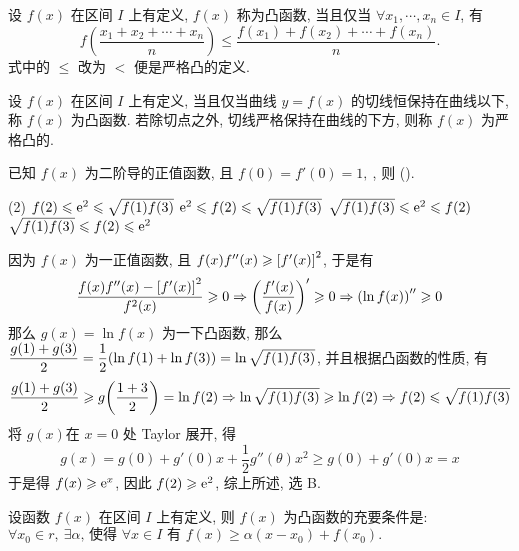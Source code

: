 \begin{definition}[凸函数 C]
    设 $ f(x) $ 在区间 $ I $ 上有定义, $f(x) $ 称为凸函数, 当且仅当 $ \forall x_{1}, \cdots, x_{n} \in   I$, 有
    $$f\left(\frac{x_{1}+x_{2}+\cdots+x_{n}}{n}\right) \leqslant \frac{f\left(x_{1}\right)+f\left(x_{2}\right)+\cdots+f\left(x_{n}\right)}{n} .$$
    式中的 $\leqslant$ 改为 $<$ 便是严格凸的定义.
\end{definition}

\begin{definition}[凸函数 D]
    设 $ f(x) $ 在区间 $ I $ 上有定义, 当且仅当曲线 $ y=f(x) $ 的切线恒保持在曲线以下, 称 $ f(x) $ 为凸函数. 若除切点之外, 切线严格保持在曲线的下方, 则称 $ f(x) $ 为严格凸的.
\end{definition}

\begin{example}
    已知 $f(x)$ 为二阶导的正值函数, 且 $f(0)=f'(0)=1,~$, 则 (\quad).
    \begin{tasks}(2)
        \task $f(2)\leqslant \mathrm{e}^{2}\leqslant \sqrt{f(1)f(3)}$
        \task $\mathrm{e}^{2}\leqslant f(2)\leqslant \sqrt{f(1)f(3)}$
        \task $\sqrt{f(1)f(3)}\leqslant \mathrm{e}^{2}\leqslant f(2)$
        \task $\sqrt{f(1)f(3)}\leqslant f(2)\leqslant \mathrm{e}^{2}$
    \end{tasks}
\end{example}
\begin{solution}
    因为 $f(x)$ 为一正值函数, 且 $f(x)f''(x)\geqslant \qty[f'(x)]^2$, 于是有 $$\dfrac{f(x)f''(x)-\qty[f'(x)]^2}{f^2(x)}\geqslant 0\Rightarrow \qty(\dfrac{f'(x)}{f(x)})'\geqslant 0\Rightarrow \qty(\ln f(x))''\geqslant 0$$
    那么 $g(x)=\ln f(x)$ 为一下凸函数, 那么 $\dfrac{g(1)+g(3)}{2}=\dfrac{1}{2}\qty(\ln f(1)+\ln f(3))=\ln\sqrt{f(1)f(3)}$, 并且根据凸函数的性质, 有 $$\dfrac{g(1)+g(3)}{2}\geqslant g\qty(\dfrac{1+3}{2})=\ln f(2)\Rightarrow \ln\sqrt{f(1)f(3)}\geqslant \ln f(2)\Rightarrow f(2)\leqslant \sqrt{f(1)f(3)}$$
    将 $g(x)$在 $x=0$ 处 Taylor 展开, 得 $$g(x)=g(0)+g'(0)x+\dfrac{1}{2}g''(\theta)x^2\geqslant g(0)+g'(0)x=x$$
    于是得 $f(x)\geqslant \mathrm{e}^x$, 因此 $f(2)\geqslant \mathrm{e}^2$, 综上所述, 选 B.
\end{solution}

\begin{theorem}
    设函数 $ f(x) $ 在区间 $ I $ 上有定义, 则 $ f(x) $ 为凸函数的充要条件是: $ \forall x_{0} \in   r,~
        \exists  \alpha \text{, 使得 } \forall x \in I  \text{ 有 }  f(x) \geqslant \alpha\left(x-x_{0}\right)+f\left(x_{0}\right) .$
\end{theorem}

